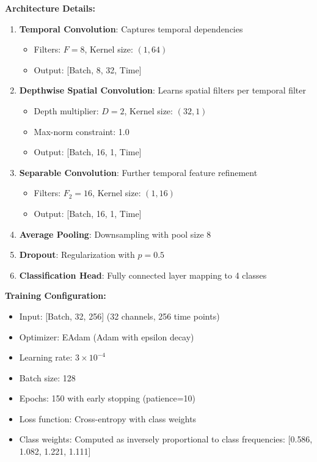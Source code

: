 \documentclass[conference]{IEEEtran}
\begin{document}
\textbf{Architecture Details:}
\begin{enumerate}
    \item \textbf{Temporal Convolution}: Captures temporal dependencies
    \begin{itemize}
        \item Filters: $F=8$, Kernel size: $(1, 64)$
        \item Output: [Batch, 8, 32, Time]
    \end{itemize}
    
    \item \textbf{Depthwise Spatial Convolution}: Learns spatial filters per temporal filter
    \begin{itemize}
        \item Depth multiplier: $D=2$, Kernel size: $(32, 1)$
        \item Max-norm constraint: 1.0
        \item Output: [Batch, 16, 1, Time]
    \end{itemize}
    
    \item \textbf{Separable Convolution}: Further temporal feature refinement
    \begin{itemize}
        \item Filters: $F_2=16$, Kernel size: $(1, 16)$
        \item Output: [Batch, 16, 1, Time]
    \end{itemize}
    
    \item \textbf{Average Pooling}: Downsampling with pool size 8
    
    \item \textbf{Dropout}: Regularization with $p=0.5$
    
    \item \textbf{Classification Head}: Fully connected layer mapping to 4 classes
\end{enumerate}

\textbf{Training Configuration:}
\begin{itemize}
    \item Input: [Batch, 32, 256] (32 channels, 256 time points)
    \item Optimizer: EAdam (Adam with epsilon decay)
    \item Learning rate: $3 \times 10^{-4}$
    \item Batch size: 128
    \item Epochs: 150 with early stopping (patience=10)
    \item Loss function: Cross-entropy with class weights
    \item Class weights: Computed as inversely proportional to class frequencies: [0.586, 1.082, 1.221, 1.111]
\end{itemize}
\end{document}
